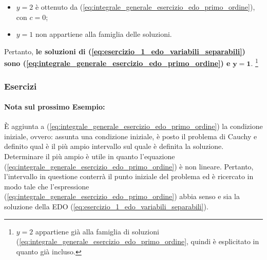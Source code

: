 \begin{example}
\begin{enumerate}
\begin{itemize}
        \item $y=2$ è ottenuto da (\ref{eq:integrale_generale_esercizio_edo_primo_ordine}), con $c=0$;
        \item $y=1$ non appartiene alla famiglia delle soluzioni.
    \end{itemize}
    Pertanto, \textbf{le soluzioni di (\ref{eq:esercizio_1_edo_variabili_separabili}) sono (\ref{eq:integrale_generale_esercizio_edo_primo_ordine}) e} $\boldsymbol{y=1}$. \footnote{$y=2$ appartiene già alla famiglia di soluzioni (\ref{eq:integrale_generale_esercizio_edo_primo_ordine}, quindi è esplicitato in quanto già incluso.}
    \end{enumerate}
\end{example}

\subsubsection{Esercizi}

\paragraph{Nota sul prossimo Esempio:} È aggiunta a (\ref{eq:integrale_generale_esercizio_edo_primo_ordine}) la condizione iniziale, ovvero: assunta una condizione iniziale, è posto il problema di Cauchy e definito qual è il più ampio intervallo sul quale è definita la soluzione. Determinare il più ampio è utile in quanto l'equazione (\ref{eq:integrale_generale_esercizio_edo_primo_ordine}) è non lineare. Pertanto, l'intervallo in questione conterrà il punto iniziale del problema ed è ricercato in modo tale che l'espressione (\ref{eq:integrale_generale_esercizio_edo_primo_ordine}) abbia senso e sia la soluzione della EDO (\ref{eq:esercizio_1_edo_variabili_separabili}).

